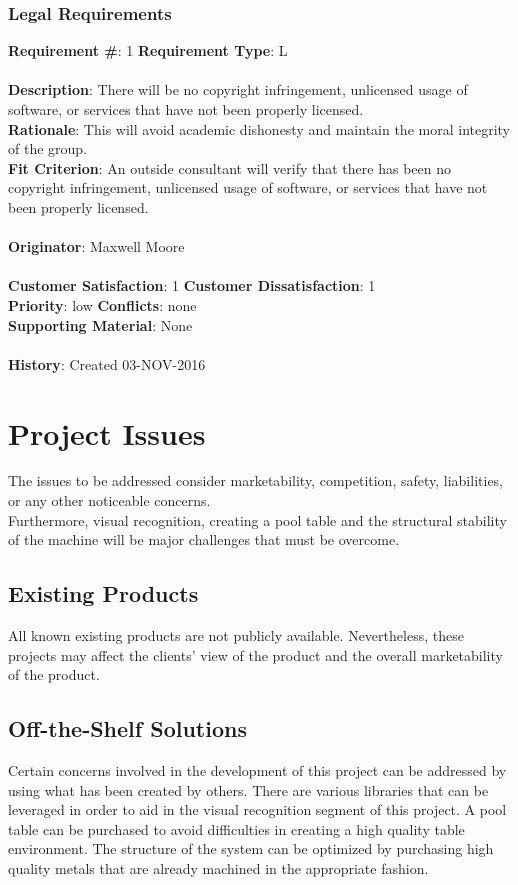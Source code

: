 \documentclass[titlepage]{article}
\begin{document}
\subsubsection{Legal Requirements}
\begin{framed}
	\noindent\textbf{Requirement \#}: 1 \hfill \textbf{Requirement Type}: L\hfill\\\\
	\noindent\textbf{Description}: There will be no copyright infringement, unlicensed usage of software, or services that have not been properly licensed.\\
	\textbf{Rationale}: This will avoid academic dishonesty and maintain the moral integrity of the group.\\
	\textbf{Fit Criterion}: An outside consultant will verify that there has been no copyright infringement, unlicensed usage of software, or services that have not been properly licensed.\\\\
	\textbf{Originator}: Maxwell Moore\\\\
	\noindent\textbf{Customer Satisfaction}: 1 \hfill 	\textbf{Customer Dissatisfaction}: 1 \hfill\\
	\textbf{Priority}: low \hfill \textbf{Conflicts}: none \hfill\\
	\textbf{Supporting Material}: None\\\\
	\noindent\textbf{History}: Created 03-NOV-2016
\end{framed}



\section{Project Issues}
The issues to be addressed consider marketability, competition, safety, liabilities, or any other noticeable concerns.\\
Furthermore, visual recognition, creating a pool table and the structural stability of the machine will be major challenges that must be overcome.
\subsection{Existing Products}
All known existing products are not publicly available. Nevertheless, these projects may affect the clients' view of the product and the overall marketability of the product.

\subsection{Off-the-Shelf Solutions}
Certain concerns involved in the development of this project can be addressed by using what has been created by others. There are various libraries that can be leveraged in order to aid in the visual recognition segment of this project. A pool table can be purchased to avoid difficulties in creating a high quality table environment. The structure of the system can be optimized by purchasing high quality metals that are already machined in the appropriate fashion.
\end{document}
